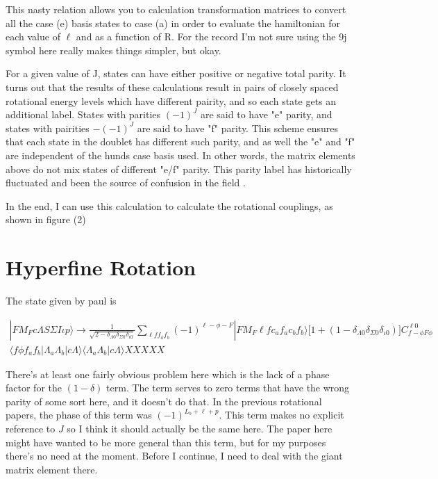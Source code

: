 \documentclass[prl, longbibliography]{revtex4-2}
\begin{document}
This nasty relation allows you to calculation transformation matrices to convert all the case (e) basis states to case (a) in order to evaluate the hamiltonian for each value of $\ell$ and as a function of R. For the record I'm not sure using the 9j symbol here really makes things simpler, but okay. 

For a given value of J, states can have either positive or negative total parity. It turns out that the results of these calculations result in pairs of closely spaced rotational energy levels which have different pairity, and so each state gets an additional label. States with parities $(-1)^J$ are said to have "e" parity, and states with pairities $-(-1)^J$ are said to have "f" parity. This scheme ensures that each state in the doublet has different such parity, and as well the "e" and "f" are independent of the hunds case basis used. In other words, the matrix elements above do not mix states of different "e/f" parity. This parity label has historically fluctuated and been the source of confusion in the field \cite{hornkohl_parity_2017,brown_labeling_1975}.

In the end, I can use this calculation to calculate the rotational couplings, as shown in figure (2)

\section{Hyperfine Rotation}

The state given by paul is

\begin{equation}
\begin{split}
|F M_F c \Lambda S \Sigma I \iota p\rangle \rightarrow \frac{1}{\sqrt{2-\delta_{\Lambda 0}\delta_{\Sigma 0} \delta_{\iota 0}}} \sum_{\ell f f_a f_b}(-1)^{\ell-\phi-F}|F M_F \ell f c_a f_a c_b f_b\rangle\Big[1+(1-\delta_{\Lambda 0}\delta_{\Sigma 0} \delta_{\iota 0})\Big]
C_{f -\phi F \phi}^{\ell 0} \\
\langle f \phi f_a f_b | \Lambda_a \Lambda_b | c \Lambda \rangle \langle \Lambda_a \Lambda_b| c \Lambda \rangle XXXXX
\end{split}
\end{equation}

There's at least one fairly obvious problem here which is the lack of a phase factor for the $(1-\delta)$ term. The term serves to zero terms that have the wrong parity of some sort here, and it doesn't do that. In the previous rotational papers, the phase of this term was $(-1)^{L_b+\ell +p}$. This term makes no explicit reference to $J$ so I think it should actually be the same here. The paper here might have wanted to be more general than this term, but for my purposes there's no need at the moment. Before I continue, I need to deal with the giant matrix element there. 
\end{document}
